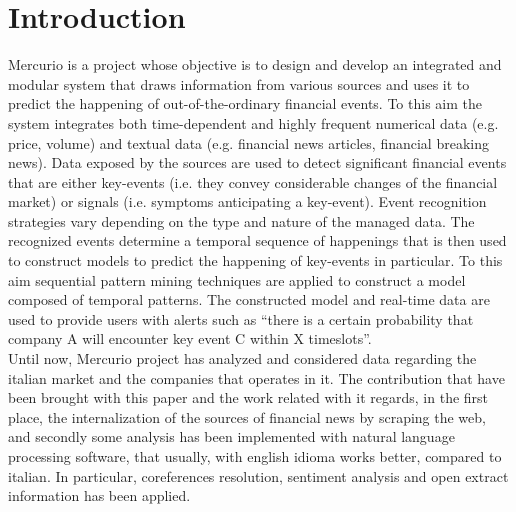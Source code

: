 \section{Introduction}
Mercurio is a project whose objective is to design and develop an integrated and modular system that draws information from various sources and uses it to predict the happening of out-of-the-ordinary financial events. To this aim the system integrates both time-dependent and highly frequent numerical data (e.g. price, volume) and textual data (e.g. financial news articles, financial breaking news).
Data exposed by the sources are used to detect significant financial events that are either key-events (i.e. they convey considerable changes of the financial market) or signals (i.e. symptoms anticipating a key-event). Event recognition strategies vary depending on the type and nature of the managed data. The recognized events determine a temporal sequence of happenings that is then used to construct models to predict the happening of key-events in particular. To this aim sequential pattern mining techniques are applied to construct a model composed of temporal patterns. The constructed model and real-time data are used to provide users with alerts such as “there is a certain probability that company A will encounter key event C within X timeslots”. \\
Until now, Mercurio project has analyzed and considered data regarding the italian market and the companies that operates in it. The contribution that have been brought with this paper and the work related with it regards, in the first place, the internalization of the sources of financial news by scraping the web, and secondly some analysis has been implemented with natural language processing software, that usually, with english idioma works better, compared to italian. In particular, coreferences resolution, sentiment analysis and open extract information has been applied. \\